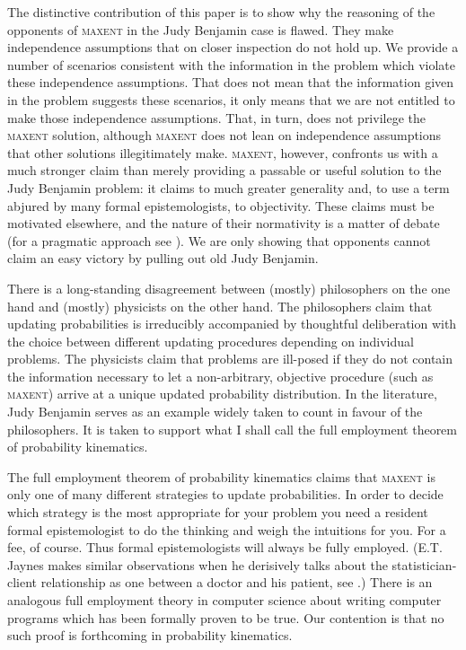 \documentclass[12pt]{article}
\begin{document}
The distinctive contribution of this paper is to show why the
reasoning of the opponents of \textsc{maxent} in the Judy Benjamin
case is flawed. They make independence assumptions that on closer
inspection do not hold up. We provide a number of scenarios consistent
with the information in the problem which violate these independence
assumptions. That does not mean that the information given in the
problem suggests these scenarios, it only means that we are not
entitled to make those independence assumptions. That, in turn, does
not privilege the \textsc{maxent} solution, although \textsc{maxent}
does not lean on independence assumptions that other solutions
illegitimately make. \textsc{maxent}, however, confronts us with a
much stronger claim than merely providing a passable or useful
solution to the Judy Benjamin problem: it claims to much greater
generality and, to use a term abjured by many formal epistemologists,
to objectivity. These claims must be motivated elsewhere, and the
nature of their normativity is a matter of debate (for a pragmatic
approach see ). We are only showing that
opponents cannot claim an easy victory by pulling out old Judy
Benjamin.

There is a long-standing disagreement between (mostly) philosophers on
the one hand and (mostly) physicists on the other hand. The
philosophers claim that updating probabilities is irreducibly
accompanied by thoughtful deliberation with the choice between
different updating procedures depending on individual problems. The
physicists claim that problems are ill-posed if they do not contain
the information necessary to let a non-arbitrary, objective procedure
(such as \textsc{maxent}) arrive at a unique updated probability
distribution. In the literature, Judy Benjamin serves as an example
widely taken to count in favour of the philosophers. It is taken to
support what I shall call the full employment theorem of probability
kinematics.

The full employment theorem of probability kinematics claims that
\textsc{maxent} is only one of many different strategies to update
probabilities. In order to decide which strategy is the most
appropriate for your problem you need a resident formal epistemologist
to do the thinking and weigh the intuitions for you. For a fee, of
course. Thus formal epistemologists will always be fully employed.
(E.T. Jaynes makes similar observations when he derisively talks about
the statistician-client relationship as one between a doctor and his
patient, see .) There is an analogous
full employment theory in computer science about writing computer
programs which has been formally proven to be true. Our contention is
that no such proof is forthcoming in probability kinematics. 
\end{document}

